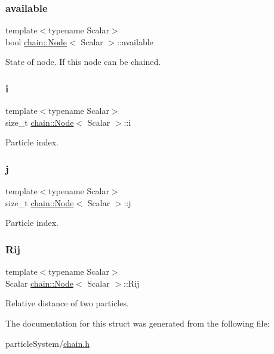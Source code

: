 \subsubsection{\texorpdfstring{available}{available}}
{\footnotesize\ttfamily template$<$typename Scalar$>$ \\
bool \mbox{\hyperlink{structchain_1_1_node}{chain\+::\+Node}}$<$ Scalar $>$\+::available}

State of node. If this node can be chained. \mbox{\label{structchain_1_1_node_a289ef3bad054158a446e53481c2a9d17}} 
\subsubsection{\texorpdfstring{i}{i}}
{\footnotesize\ttfamily template$<$typename Scalar$>$ \\
size\+\_\+t \mbox{\hyperlink{structchain_1_1_node}{chain\+::\+Node}}$<$ Scalar $>$\+::i}

Particle index. \mbox{\label{structchain_1_1_node_aa41c0c59d6cdd4263a72b9e5284aa3d9}} 
\subsubsection{\texorpdfstring{j}{j}}
{\footnotesize\ttfamily template$<$typename Scalar$>$ \\
size\+\_\+t \mbox{\hyperlink{structchain_1_1_node}{chain\+::\+Node}}$<$ Scalar $>$\+::j}

Particle index. \mbox{\label{structchain_1_1_node_a3a9ca49370eba9c8ce1d6b2a146c93ee}} 
\subsubsection{\texorpdfstring{Rij}{Rij}}
{\footnotesize\ttfamily template$<$typename Scalar$>$ \\
Scalar \mbox{\hyperlink{structchain_1_1_node}{chain\+::\+Node}}$<$ Scalar $>$\+::Rij}

Relative distance of two particles. 

The documentation for this struct was generated from the following file\+:\begin{DoxyCompactItemize}
\item 
particle\+System/\mbox{\hyperlink{chain_8h}{chain.\+h}}\end{DoxyCompactItemize}
